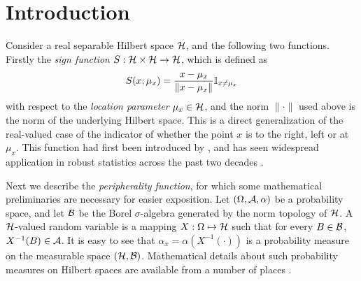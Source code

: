 \section{Introduction}\label{sec:scatter-sec1-intro}

Consider a real separable Hilbert space ${\cal{H}}$, and the following two functions. Firstly the {\it sign function} $S : {\cal{H}} \times {\cal{H}} \rightarrow {\cal{H}}$, which is defined as
%
\begin{align}\label{eqn:signEqn}
S (x; \mu_{x}) = \frac{x - \mu_{x}}{\| x - \mu_{x} \|} {{\mathbb{I}}}_{ x \ne \mu_{x} }
\end{align}
%
with respect to the {\it location parameter} $\mu_{x} \in {\cal{H}}$, and the norm $\| \cdot \|$ used above is the norm of the underlying Hilbert space. This is a direct  generalization of the real-valued case of the indicator of whether the point $x$ is to the right, left or at $\mu_{x}$. This function had first been introduced by \cite{MottonenOja95}, and has seen widespread application in robust statistics across the past two decades \citep{LocantoreEtal99, OjaBook10, WangPengLi15}.

Next we describe the {\it peripherality function}, for which some mathematical preliminaries are necessary for easier exposition. Let $(\Omega, {\cal{A}}, \alpha)$ be a probability space, and let ${\cal{B}}$ be the Borel $\sigma$-algebra generated by the norm topology of ${\cal{H}}$. A ${\cal{H}}$-valued random variable is a mapping $X :  \Omega \mapsto {\cal{H}}$ such that for every $B \in {\cal{B}}$, $X^{-1} (B) \in {\cal{A}}$. It is easy to see that $\alpha_{x} = \alpha ( X^{-1} (\cdot ) )$ is a probability measure on the measurable space $({\cal{H}}, {\cal{B}})$. Mathematical details about such probability measures on Hilbert spaces are available from a number of places \citep{Segal58,Gross67}.

